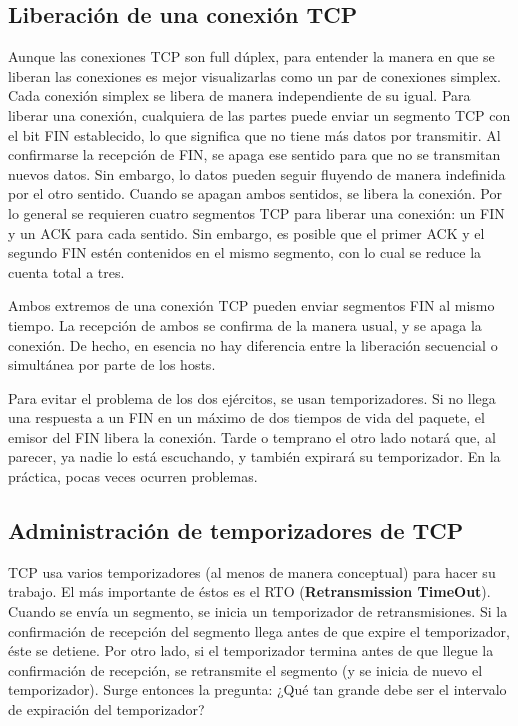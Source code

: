 \documentclass[10pt,a4paper]{report}
\begin{document}
\subsection{Liberación de una conexión TCP}

	\par Aunque las conexiones TCP son full dúplex, para entender la manera en que se liberan las conexiones es mejor visualizarlas como un par de conexiones simplex. Cada conexión simplex se libera de manera independiente de su igual. Para liberar una conexión, cualquiera de las partes puede enviar un segmento TCP con el bit FIN establecido, lo que significa que no tiene más datos por transmitir. Al confirmarse la recepción de FIN, se apaga ese sentido para que no se transmitan nuevos datos. Sin embargo, lo datos pueden seguir fluyendo de manera indefinida por el otro sentido. Cuando se apagan ambos sentidos, se libera la conexión. Por lo general se requieren cuatro segmentos TCP para liberar una conexión: un FIN y un ACK para cada sentido. Sin embargo, es posible que el primer ACK y el segundo FIN estén contenidos en el mismo segmento, con lo cual se reduce la cuenta total a tres.
	
	\par Ambos extremos de una conexión TCP pueden enviar segmentos FIN al mismo tiempo. La recepción de ambos se confirma de la manera usual, y se apaga la conexión. De hecho, en esencia no hay diferencia entre la liberación secuencial o simultánea por parte de los hosts.
	
	\par Para evitar el problema de los dos ejércitos, se usan temporizadores. Si no llega una respuesta a un FIN en un máximo de dos tiempos de vida del paquete, el emisor del FIN libera la conexión. Tarde o temprano el otro lado notará que, al parecer, ya nadie lo está escuchando, y también expirará su temporizador. En la práctica, pocas veces ocurren problemas.

\subsection{Administración de temporizadores de TCP}

	\par TCP usa varios temporizadores (al menos de manera conceptual) para hacer su trabajo. El más importante de éstos es el RTO (\textbf{Retransmission TimeOut}). Cuando se envía un segmento, se inicia un temporizador de retransmisiones. Si la confirmación de recepción del segmento llega antes de que expire el temporizador, éste se detiene. Por otro lado, si el temporizador termina antes de que llegue la confirmación de recepción, se retransmite el segmento (y se inicia de nuevo el temporizador). Surge entonces la pregunta: ¿Qué tan grande debe ser el intervalo de expiración del temporizador?
\end{document}
